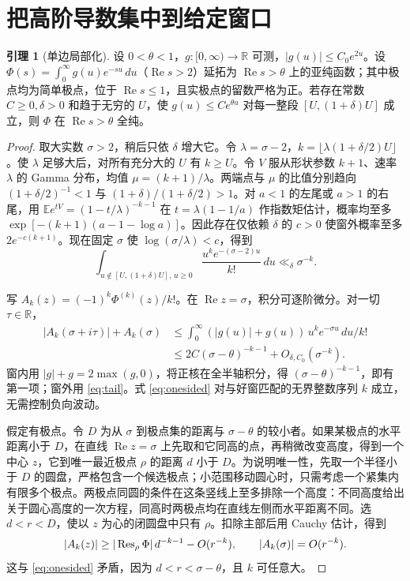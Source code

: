 \documentclass[UTF8,fontset=none,a4paper,11pt]{ctexart}
\theoremstyle{definition}
\newtheorem{lem}[thm]{引理}
\newcommand{\R}{\mathbb R}\newcommand{\C}{\mathbb C}
\newcommand{\re}{\operatorname{Re}}\newcommand{\e}{\varepsilon}
\begin{document}
\section{把高阶导数集中到给定窗口}\label{sec:local-window}
\begin{lem}[单边局部化]\label{lem:local}
设 $0<\theta<1$，$g:[0,\infty)\to\R$ 可测，$|g(u)|\le C_0e^{2u}$。设 $\Phi(s)=\int_0^\infty g(u)e^{-su}\,du$（$\re s>2$）延拓为 $\re s>\theta$ 上的亚纯函数；其中极点均为简单极点，位于 $\re s\le1$，且实极点的留数严格为正。若存在常数 $C\ge0,\delta>0$ 和趋于无穷的 $U$，使 $g(u)\le Ce^{\theta u}$ 对每一整段 $[U,(1+\delta)U]$ 成立，则 $\Phi$ 在 $\re s>\theta$ 全纯。
\end{lem}
\begin{proof}
取大实数 $\sigma>2$，稍后只依 $\delta$ 增大它。令 $\lambda=\sigma-2$，$k=\lfloor\lambda(1+\delta/2)U\rfloor$。使 $\lambda$ 足够大后，对所有充分大的 $U$ 有 $k\ge U$。令 $V$ 服从形状参数 $k+1$、速率 $\lambda$ 的 Gamma 分布，均值 $\mu=(k+1)/\lambda$。两端点与 $\mu$ 的比值分别趋向 $(1+\delta/2)^{-1}<1$ 与 $(1+\delta)/(1+\delta/2)>1$。对 $a<1$ 的左尾或 $a>1$ 的右尾，用 $\mathbb E e^{tV}=(1-t/\lambda)^{-k-1}$ 在 $t=\lambda(1-1/a)$ 作指数矩估计，概率均至多 $\exp[-(k+1)(a-1-\log a)]$。因此存在仅依赖 $\delta$ 的 $c>0$ 使窗外概率至多 $2e^{-c(k+1)}$。现在固定 $\sigma$ 使 $\log(\sigma/\lambda)<c$，得到
\begin{equation}
 \int_{u\notin[U,(1+\delta)U],\,u\ge0}
       \frac{u^k e^{-(\sigma-2)u}}{k!}\,du\ll_\delta \sigma^{-k}. \label{eq:tail}
\end{equation}

写 $A_k(z)=(-1)^k\Phi^{(k)}(z)/k!$。在 $\re z=\sigma$，积分可逐阶微分。对一切 $\tau\in\R$，
\begin{align}
 |A_k(\sigma+i\tau)|+A_k(\sigma)
 &\le\int_0^\infty (|g(u)|+g(u))\,u^ke^{-\sigma u}\,du/k!\nonumber\\
 &\le 2C(\sigma-\theta)^{-k-1}+O_{\delta,C_0}(\sigma^{-k}).
 \label{eq:onesided}
\end{align}
窗内用 $|g|+g=2\max(g,0)$，将正核在全半轴积分，得 $(\sigma-\theta)^{-k-1}$，即有第一项；窗外用 \eqref{eq:tail}。式 \eqref{eq:onesided} 对与好窗匹配的无界整数序列 $k$ 成立，无需控制负向波动。

假定有极点。令 $D$ 为从 $\sigma$ 到极点集的距离与 $\sigma-\theta$ 的较小者。如果某极点的水平距离小于 $D$，在直线 $\re z=\sigma$ 上先取和它同高的点，再稍微改变高度，得到一个中心 $z$，它到唯一最近极点 $\rho$ 的距离 $d$ 小于 $D$。为说明唯一性，先取一个半径小于 $D$ 的圆盘，严格包含一个候选极点；小范围移动圆心时，只需考虑一个紧集内有限多个极点。两极点同圆的条件在这条竖线上至多排除一个高度：不同高度给出关于圆心高度的一次方程，同高时两极点均在直线左侧而水平距离不同。选 $d<r<D$，使以 $z$ 为心的闭圆盘中只有 $\rho$。扣除主部后用 Cauchy 估计，得到
\[
 |A_k(z)|\ge |\operatorname{Res}_\rho\Phi|\,d^{-k-1}-O(r^{-k}),
 \qquad |A_k(\sigma)|=O(r^{-k}).
\]
这与 \eqref{eq:onesided} 矛盾，因为 $d<r<\sigma-\theta$，且 $k$ 可任意大。


\end{proof}
\end{document}
